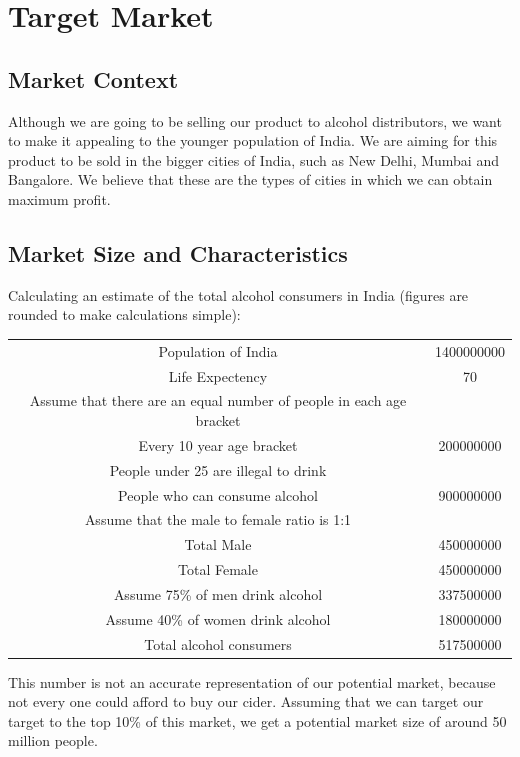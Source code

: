 \documentclass[11pt]{article}
\begin{document}
\section{Target Market}
  \subsection{Market Context}
Although we are going to be selling our product to alcohol distributors, we want
to make it appealing to the younger population of India. We are aiming for this
product to be sold in the bigger cities of India, such as New Delhi, Mumbai and
Bangalore. We believe that these are the types of cities in which we can
obtain maximum profit.

  \subsection{Market Size and Characteristics}
Calculating an estimate of the total alcohol consumers in India (figures are
rounded to make calculations simple):

		\begin{center}
			\begin{tabular}{ | c | c | } \hline
				Population of India & 1400000000 \\
				Life Expectency & 70 \\
				Assume that there are an equal number of people in each age bracket & \\
				Every 10 year age bracket & 200000000 \\
				People under 25 are illegal to drink & \\
				People who can consume alcohol & 900000000 \\
				Assume that the male to female ratio is 1:1 & \\
				Total Male & 450000000 \\
				Total Female & 450000000 \\
				Assume 75\% of men drink alcohol & 337500000 \\
				Assume 40\% of women drink alcohol & 180000000 \\
				Total alcohol consumers & 517500000 \\ \hline
			\end{tabular}
		\end{center}

This number is not an accurate representation of our potential market, because 
not every one could afford to buy our cider. Assuming that we can target our
target to the top 10\% of this market, we get a potential market size of around
50 million people.
\end{document}
